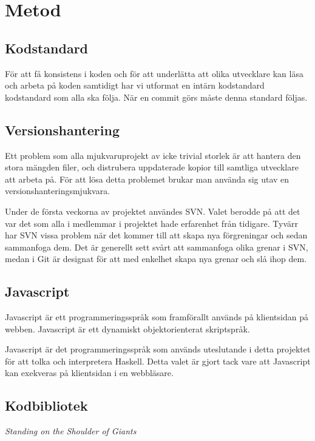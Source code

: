 ﻿\section{Metod} 

\subsection{Kodstandard} 
För att få konsistens i koden och för att underlätta att olika utvecklare kan läsa och arbeta på koden samtidigt har vi utformat en intärn kodstandard kodstandard som alla ska följa.
När en commit görs måste denna standard följas.


\subsection{Versionshantering} 
Ett problem som alla mjukvaruprojekt av icke trivial storlek är att hantera den stora mängden filer, och distrubera uppdaterade kopior till samtliga utvecklare att arbeta på.
För att lösa detta problemet brukar man använda sig utav en versionshanteringsmjukvara. 

Under de första veckorna av projektet användes SVN. Valet berodde på att det var det som alla i medlemmar i projektet hade erfarenhet från tidigare. Tyvärr har SVN vissa problem när det kommer till att skapa nya förgreningar och sedan sammanfoga dem. Det är generellt sett svårt att sammanfoga olika grenar i SVN, medan i Git är designat för att med enkelhet skapa nya grenar och slå ihop dem.   



\subsection{Javascript} 
Javascript \citep{javascript} är ett programmeringsspråk som framförallt används på klientsidan på webben. Javascript är ett dynamiskt objektorienterat skriptspråk.

Javascript är det programmeringsspråk som används uteslutande i detta projektet för att tolka och interpretera Haskell.
Detta valet är gjort tack vare att Javascript kan exekveras på klientsidan i en webbläsare.

\subsection{Kodbibliotek}

\emph{Standing on the Shoulder of Giants}

